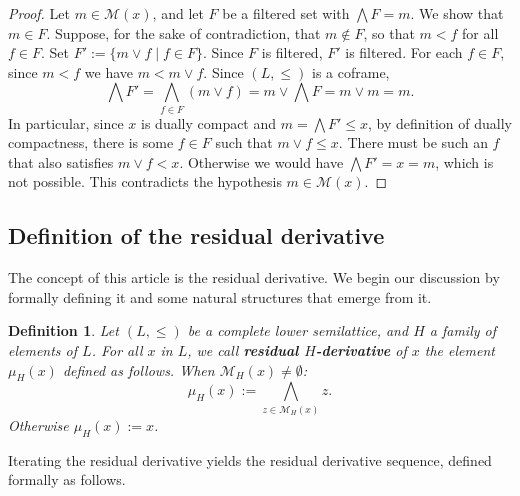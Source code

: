 \documentclass{article}
\newcommand{\blue}{\color{blue}}
\newtheorem{definition}[theorem]{Definition}
\begin{document}
\begin{proof}
{Let \(m\in\mathcal{M}(x)\), and let \(F\) be a filtered set with \(\bigwedge F=m\). We show that \(m\in F\). Suppose, for the sake of contradiction, that \(m\notin F\), so that \(m < f\) for all \(f\in F\). Set \(F':=\{m\vee f\mid f\in F\}\). Since \(F\) is filtered, \(F'\) is filtered. For each \(f\in F\), since \(m < f\) we have \(m<m\vee f\). Since $(L,\le)$ is a coframe, 
\[
\bigwedge F'=\bigwedge_{f\in F}(m\vee f)=m\vee\bigwedge F=m\vee m=m.
\]
In particular, since $x$ is dually compact and $m = \bigwedge F' \le x$, by definition of dually compactness, there is some $f \in F$ such that $m \vee f \le x$.
There must be such an $f$ that also satisfies $m \vee f < x$. Otherwise we would have $\bigwedge F' = x = m$, which is not possible. This contradicts the hypothesis $m \in \mathcal{M}(x)$.}
\end{proof}



\subsection{Definition of the residual derivative\label{section.fratt.derivative}}

{The concept of this article is the residual derivative. We begin our discussion by formally defining it and some natural structures that emerge from it.}



\begin{definition}
    Let $(L,\le)$ be a complete lower semilattice, and $H$ a family of elements of $L$. For all $x$ in $L$, we call \textbf{residual $H$-derivative} of $x$ the element $\mu_H(x)$ defined as follows. When $\mathcal{M}_H(x) \neq \emptyset$: 
    \[\mu_H(x) := \underset{z \in \mathcal{M}_H(x)}{\bigwedge} z.\]
    Otherwise $\mu_H(x) := x$.
\end{definition}

Iterating the residual derivative yields the residual derivative sequence, defined formally as follows.

\end{document}
